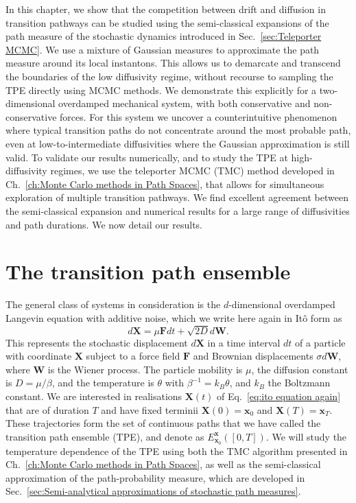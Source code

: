 In this chapter, we show that the competition between drift and diffusion
in transition pathways can be studied using the semi-classical expansions
of the path measure of the stochastic dynamics introduced in Sec.~\ref{sec:Teleporter MCMC}. We use a mixture of
Gaussian measures to approximate the path measure around its local
instantons. This allows us to demarcate and transcend the boundaries
of the low diffusivity regime, without recourse to sampling the TPE directly using MCMC methods. We demonstrate this explicitly for
a two-dimensional overdamped mechanical system, with both conservative
and non-conservative forces. For this system we uncover a counterintuitive
phenomenon where typical transition paths do not concentrate around
the most probable path, even at low-to-intermediate diffusivities
where the Gaussian approximation is still valid. To validate our results
numerically, and to study the TPE at high-diffusivity regimes, we use the teleporter MCMC (TMC) method developed in Ch.~\ref{ch:Monte Carlo methods in Path Spaces},
that allows for simultaneous exploration of multiple transition pathways. We
find excellent agreement between the semi-classical expansion and
numerical results for a large range of diffusivities and path durations.
We now detail our results.

\section{The transition path ensemble}

The general class of systems in consideration is the $d$-dimensional overdamped Langevin equation with additive noise, which we write here again in Itô form as
\begin{equation} \label{eq:ito equation again}
d\mathbf{X}=\mu\mathbf{F}dt+\sqrt{2D}d\mathbf{W}. 
\end{equation}
This represents the stochastic displacement $d\mathbf{X}$ in a time
interval $dt$ of a particle with coordinate $\mathbf{X}$ subject
to a force field $\mathbf{F}$ and Brownian displacements $\sigma d\mathbf{W}$,
where $\mathbf{W}$ is the Wiener process. The particle mobility is
$\mu$, the diffusion constant is $D=\mu/\beta$, and the temperature
is $\theta$ with $\beta^{-1}=k_{B}\theta$, and $k_{B}$ the Boltzmann
constant. We are interested in realisations $\mathbf{X}(t)$ of Eq.~\ref{eq:ito equation again}
that are of duration $T$ and have fixed terminii $\mathbf{X}(0)=\mathbf{x}_{0}$
and $\mathbf{X}(T)=\mathbf{x}_{T}$. These trajectories form the set
of continuous paths that we have called the transition path ensemble (TPE), and denote as $E_{\mathbf{x}_0}^{\mathbf{x}}([0,T])$. We will study the temperature dependence of the TPE using both the TMC algorithm presented in Ch.~\ref{ch:Monte Carlo methods in Path Spaces}, as well as the semi-classical approximation of the path-probability measure, which are developed in Sec.~\ref{sec:Semi-analytical approximations of stochastic path measures}.

